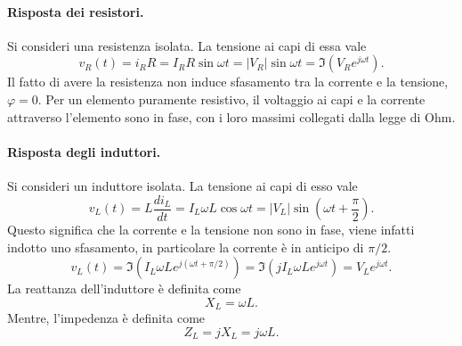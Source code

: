 \paragraph{Risposta dei resistori.} Si consideri una resistenza isolata. La tensione ai capi di essa vale
\begin{equation}
    v_R(t)=i_RR=I_RR\sin{\omega t}=|V_R|\sin{\omega t}=\Im\left(V_Re^{j\omega t}\right).
\end{equation}
Il fatto di avere la resistenza non induce sfasamento tra la corrente e la tensione, $\varphi=0$. Per un elemento puramente resistivo, il voltaggio ai capi e la corrente attraverso l'elemento sono in fase, con i loro massimi collegati dalla legge di Ohm.

\paragraph{Risposta degli induttori.} Si consideri un induttore isolata. La tensione ai capi di esso vale
\begin{equation}
    v_L(t)=L\frac{di_L}{dt}=I_L\omega L\cos{\omega t}=|V_L|\sin{\left(\omega t+\frac{\pi}{2}\right)}.
\end{equation}
Questo significa che la corrente e la tensione non sono in fase, viene infatti indotto uno sfasamento, in particolare la corrente è in anticipo di $\pi/2$.
\begin{equation}
    v_L(t)=\Im(I_L\omega Le^{j\left(\omega t+\pi/2\right)})=\Im(jI_L\omega Le^{j\omega t})=V_Le^{j\omega t}.
\end{equation}
La reattanza dell'induttore è definita come
\begin{equation}
    X_L=\omega L.
\end{equation}
Mentre, l'impedenza è definita come
\begin{equation}
    Z_L=jX_L=j\omega L.
\end{equation}

